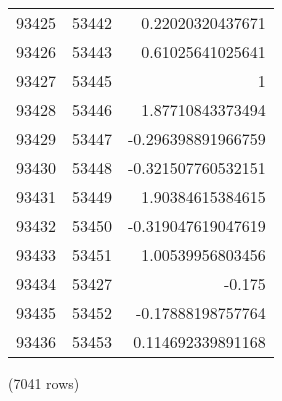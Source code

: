 \begin{tabular}{r | r | r}
93425 & 53442 & 0.22020320437671 \\
93426 & 53443 & 0.61025641025641 \\
93427 & 53445 & 1 \\
93428 & 53446 & 1.87710843373494 \\
93429 & 53447 & -0.296398891966759 \\
93430 & 53448 & -0.321507760532151 \\
93431 & 53449 & 1.90384615384615 \\
93432 & 53450 & -0.319047619047619 \\
93433 & 53451 & 1.00539956803456 \\
93434 & 53427 & -0.175 \\
93435 & 53452 & -0.17888198757764 \\
93436 & 53453 & 0.114692339891168 \\
\end{tabular}

\noindent (7041 rows) \\

